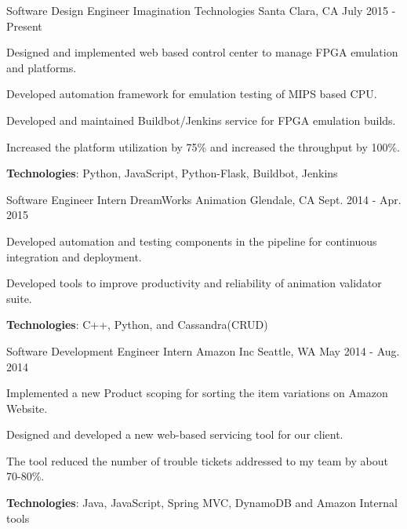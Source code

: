 \begin{cventries}
  \cventry
    {Software Design Engineer}
    {Imagination Technologies}
    {Santa Clara, CA}
    {July 2015 - Present}
    {
      \begin{cvitems}
        \item {Designed and implemented web based control center to manage FPGA emulation and platforms.}
        \item {Developed automation framework for emulation testing of MIPS based CPU.}                
        \item {Developed and maintained Buildbot/Jenkins service for FPGA emulation builds.}
        \item {Increased the platform utilization by 75\% and increased the throughput by 100\%.}
        \item {\textbf{Technologies}: Python, JavaScript, Python-Flask, Buildbot, Jenkins}
      \end{cvitems}
    }
    {}
    {}
  \cventry
    {Software Engineer Intern}
    {DreamWorks Animation}
    {Glendale, CA}
    {Sept. 2014 - Apr. 2015}
    {
      \begin{cvitems}
        \item {Developed automation and testing components in the pipeline for continuous integration and deployment.}
        \item {Developed tools to improve productivity and reliability of animation validator suite.}
        \item {\textbf{Technologies}: C++, Python, and Cassandra(CRUD)}
      \end{cvitems}
    }
    {}
    {}
  \cventry
    {Software Development Engineer Intern}
    {Amazon Inc}
    {Seattle, WA}
    {May 2014 - Aug. 2014}
    {
      \begin{cvitems}
        \item {Implemented a new Product scoping for sorting the item variations on Amazon Website.}
        \item {Designed and developed a new web-based servicing tool for our client.}
        \item {The tool reduced the number of trouble tickets addressed to my team by about 70-80\%.}
        \item {\textbf{Technologies}: Java, JavaScript, Spring MVC, DynamoDB and Amazon Internal tools}
      \end{cvitems} 
    }
    {}
    {}
    
\end{cventries}
